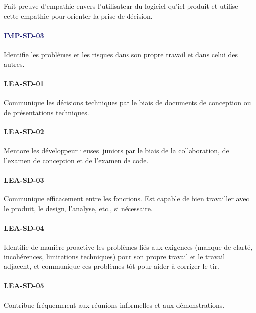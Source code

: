 \documentclass[a4paper, french, openany, 12pt]{book}
\newcommand\wis[1]{\textcolor{MidnightBlue}{\textbf{\uppercase{imp-{#1}}}}}
\newcommand\cha[1]{\textcolor{OliveGreen}{\textbf{\uppercase{lea-{#1}}}}}
\newcommand\devs{développeur·euses}
\begin{document}
\begin{multicols}{2}
  Fait preuve d'empathie envers l'utilisateur du logiciel qu'iel produit et utilise cette empathie pour orienter la 
  prise de décision.

  \paragraph*{\wis{sd-03}}

  Identifie les problèmes et les risques dans son propre travail et dans celui des autres.

  \paragraph*{\cha{sd-01}}

  Communique les décisions techniques par le biais de documents de conception ou de présentations techniques.

  \paragraph*{\cha{sd-02}}

  Mentore les \devs\ juniors par le biais de la collaboration, de l'examen de conception et de l'examen de code. 

  \paragraph*{\cha{sd-03}}

  Communique efficacement entre les fonctions.
  Est capable de bien travailler avec le produit, le design, l'analyse, etc., si nécessaire.

  \paragraph*{\cha{sd-04}}

  Identifie de manière proactive les problèmes liés aux exigences (manque de clarté, incohérences, limitations 
  techniques) pour son propre travail et le travail adjacent, et communique ces problèmes tôt pour aider à corriger le 
  tir.

  \paragraph*{\cha{sd-05}}

  Contribue fréquemment aux réunions informelles et aux démonstrations.

\end{multicols}
\end{document}
